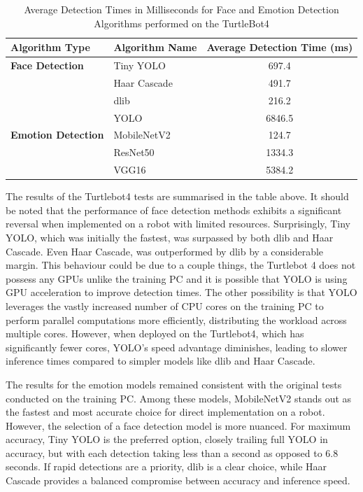 \begin{table}[h!]
\centering
\caption{Average Detection Times in Milliseconds for Face and Emotion Detection Algorithms performed on the TurtleBot4}
\begin{tabular}{|l|l|c|}
\hline
\textbf{Algorithm Type} & \textbf{Algorithm Name} & \textbf{Average Detection Time (ms)} \\ \hline
\textbf{Face Detection} & Tiny YOLO               & 697.4                                \\ \cline{2-3} 
                        & Haar Cascade            & 491.7                                \\ \cline{2-3} 
                        & dlib                    & 216.2                                \\ \cline{2-3} 
                        & YOLO                    & 6846.5                               \\ \hline
\textbf{Emotion Detection} & MobileNetV2          & 124.7                                \\ \cline{2-3} 
                        & ResNet50                & 1334.3                               \\ \cline{2-3} 
                        & VGG16                   & 5384.2                               \\ \hline
\end{tabular}
\label{tab:algorithm_detection_times_ms_robot}
\end{table}

The results of the Turtlebot4 tests are summarised in the table above. It should be noted that the performance of face detection methods exhibits a significant reversal when implemented on a robot with limited resources. Surprisingly, Tiny YOLO, which was initially the fastest, was surpassed by both dlib and Haar Cascade. Even Haar Cascade, was outperformed by dlib by a considerable margin. This behaviour could be due to a couple things, the Turtlebot 4 does not possess any GPUs unlike the training PC and it is possible that YOLO is using GPU acceleration to improve detection times. The other possibility is that YOLO leverages the vastly increased number of CPU cores on the training PC to perform parallel computations more efficiently, distributing the workload across multiple cores. However, when deployed on the Turtlebot4, which has significantly fewer cores, YOLO's speed advantage diminishes, leading to slower inference times compared to simpler models like dlib and Haar Cascade.

The results for the emotion models remained consistent with the original tests conducted on the training PC. Among these models, MobileNetV2 stands out as the fastest and most accurate choice for direct implementation on a robot. However, the selection of a face detection model is more nuanced. For maximum accuracy, Tiny YOLO is the preferred option, closely trailing full YOLO in accuracy, but with each detection taking less than a second as opposed to 6.8 seconds. If rapid detections are a priority, dlib is a clear choice, while Haar Cascade provides a balanced compromise between accuracy and inference speed.